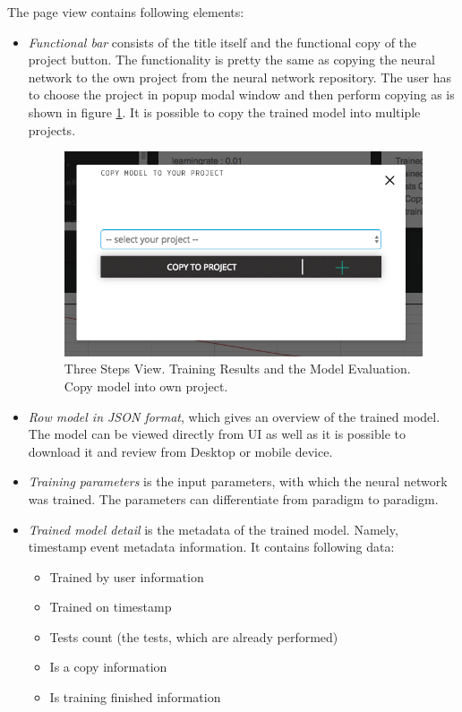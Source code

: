 The page view contains following elements:
\begin{itemize}
\item \emph{Functional bar} consists of the title itself and the functional copy of the project button. The functionality is pretty the same as copying the neural network to the own project from the neural network repository. The user has to choose the project in popup modal window and then perform copying as is shown in figure \ref{fig:copy_model}. It is possible to copy the trained model into multiple projects. 

\begin{figure}[htbp]
\begin{center}
  \includegraphics[scale=0.5]{components/5/img/copy_model.png}
  \caption{Three Steps View. Training Results and the Model Evaluation. Copy model into own project.}
  \label{fig:copy_model}
\end{center}
\end{figure}

\item \emph{Row model in JSON format}, which gives an overview of the trained model. The model can be viewed directly from UI as well as it is possible to download it and review from Desktop or mobile device. 
\item \emph{Training parameters} is the input parameters, with which the neural network was trained. The parameters can differentiate from paradigm to paradigm.
\item \emph{Trained model detail} is the metadata of the trained model. Namely, timestamp event metadata information. It contains following data:
\begin{itemize}
\item Trained by user information
\item Trained on timestamp
\item Tests count (the tests, which are already performed)
\item Is a copy information
\item Is training finished information
\end{itemize}


\end{itemize}

